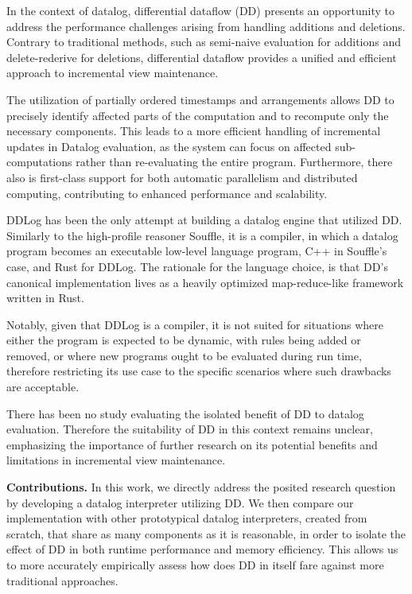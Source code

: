 \documentclass[sigconf,screen,review=false,natbib]{acmart}
\theoremstyle{definition}
\begin{document}
In the context of datalog, differential dataflow (DD) presents an opportunity to address the performance challenges
arising from handling additions and deletions. Contrary to traditional methods, such as semi-naive evaluation for
additions and delete-rederive for deletions, differential dataflow provides a unified and efficient approach to
incremental view maintenance.

The utilization of partially ordered timestamps and arrangements allows DD to precisely
identify affected parts of the computation and to recompute only the necessary components. This leads to
a more efficient handling of incremental updates in Datalog evaluation, as the system can focus on affected
sub-computations rather than re-evaluating the entire program. Furthermore, there also is first-class support
for both automatic parallelism and distributed computing, contributing to enhanced performance and scalability.

DDLog\cite{ddlog} has been the only attempt at building a datalog engine that utilized DD.
Similarly to the high-profile reasoner Souffle\cite{souffle}, it is a compiler, in which a datalog program
becomes an executable low-level language program, C++ in Souffle's case, and Rust for DDLog. The rationale for
the language choice, is that DD's canonical implementation lives as a heavily optimized
map-reduce-like framework written in Rust.

Notably, given that DDLog is a compiler, it is not suited for situations where either the program is expected
to be dynamic, with rules being added or removed, or where new programs ought to be evaluated during run
time, therefore restricting its use case to the specific scenarios where such drawbacks are acceptable.

There has been no study evaluating the isolated benefit of DD to datalog evaluation. Therefore
the suitability of DD in this context remains unclear, emphasizing the importance of further
research on its potential benefits and limitations in incremental view maintenance.

\textbf{Contributions.} In this work, we directly address the posited research question by developing a datalog
interpreter utilizing DD. We then compare our implementation with other prototypical datalog
interpreters, created from scratch, that share as many components as it is reasonable, in order to isolate
the effect of DD in both runtime performance and memory efficiency. This allows us to more
accurately empirically assess how does DD in itself fare against more traditional approaches.
\end{document}
